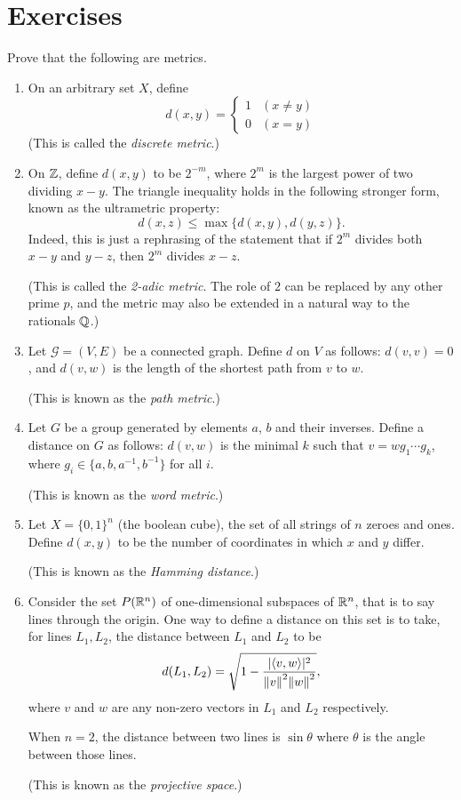 \section*{Exercises}
\begin{exercise}
Prove that the following are metrics.
\begin{enumerate}[label=(\roman*)]
\item On an arbitrary set $X$, define
\[d(x,y)=\begin{cases}
1&(x\neq y)\\
0&(x=y)
\end{cases}\]
(This is called the \emph{discrete metric}.)

\item On $\mathbb Z$, define $d(x,y)$ to be $2^{-m}$, where $2^m$ is the largest power of two dividing $x-y$. The triangle inequality holds in the following stronger form, known as the ultrametric property:
\[d(x,z)\le\max\{d(x,y),d(y,z)\}.\]
Indeed, this is just a rephrasing of the statement that if $2^m$ divides both $x-y$ and $y-z$, then $2^m$ divides $x-z$.

(This is called the \emph{2-adic metric}. The role of $2$ can be replaced by any other prime $p$, and the metric may also be extended in a natural way to the rationals $\mathbb Q$.)

\item Let $\mathcal{G}=(V,E)$ be a connected graph. Define $d$ on $V$ as follows: $d(v,v)=0$, and $d(v,w)$ is the length of the shortest path from $v$ to $w$.

(This is known as the \emph{path metric}.)

\item Let $G$ be a group generated by elements $a$, $b$ and their inverses. Define a distance on $G$ as follows: $d(v,w)$ is the minimal $k$ such that $v=wg_1\cdots g_k$, where $g_i\in\{a,b,a^{-1},b^{-1}\}$ for all $i$.

(This is known as the \emph{word metric}.)

\item Let $X=\{0,1\}^n$ (the boolean cube), the set of all strings of $n$ zeroes and ones. Define $d(x,y)$ to be the number of coordinates in which $x$ and $y$ differ.

(This is known as the \emph{Hamming distance}.)

\item Consider the set $P(\mathbb R^n)$ of one-dimensional subspaces of $\mathbb R^n$, that is to say lines through the origin. One way to define a distance on this set is to take, for lines $L_1,L_2$, the distance between $L_1$ and $L_2$ to be
\[d(L_1,L_2)=\sqrt{1-\frac{|\langle v,w\rangle|^2}{\norm{v}^2\norm{w}^2}},\]
where $v$ and $w$ are any non-zero vectors in $L_1$ and $L_2$ respectively.

When $n=2$, the distance between two lines is $\sin\theta$ where $\theta$ is the angle between those lines.

(This is known as the \emph{projective space}.)
\end{enumerate}
\end{exercise}

